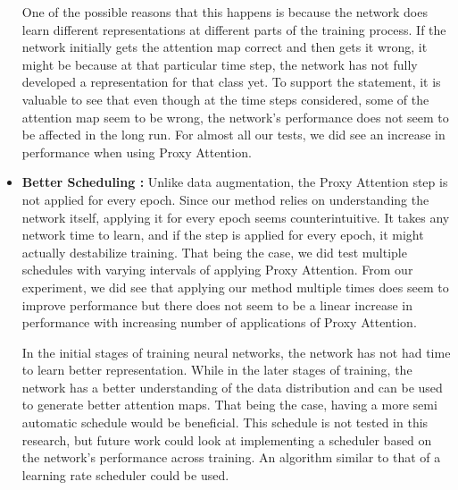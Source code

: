 \documentclass[a4paper,11pt,openright]{book}
\begin{document}
\begin{itemize}
One of the possible reasons that this happens is because the network does learn different representations at different parts of the training process. If the network initially gets the attention map correct and then gets it wrong, it might be because at that particular time step, the network has not fully developed a representation for that class yet. To support the statement, it is valuable to see that even though at the time steps considered, some of the attention map seem to be wrong, the network's performance does not seem to be affected in the long run. For almost all our tests, we did see an increase in performance when using Proxy Attention.
\item \textbf{Better Scheduling :} Unlike data augmentation, the Proxy Attention step is not applied for every epoch. Since our method relies on understanding the network itself, applying it for every epoch seems counterintuitive. It takes any network time to learn, and if the step is applied for every epoch, it might actually destabilize training. That being the case, we did test multiple schedules with varying intervals of applying Proxy Attention. From our experiment, we did see that applying our method multiple times does seem to improve performance but there does not seem to be a linear increase in performance with increasing number of applications of Proxy Attention. 

In the initial stages of training neural networks, the network has not had time to learn better representation. While in the later stages of training, the network has a better understanding of the data distribution and can be used to generate better attention maps. That being the case, having a more semi automatic schedule would be beneficial. This schedule is not tested in this research, but future work could look at implementing a scheduler based on the network's performance across training. An algorithm similar to that of a learning rate scheduler could be used.
\end{itemize}
\end{document}
